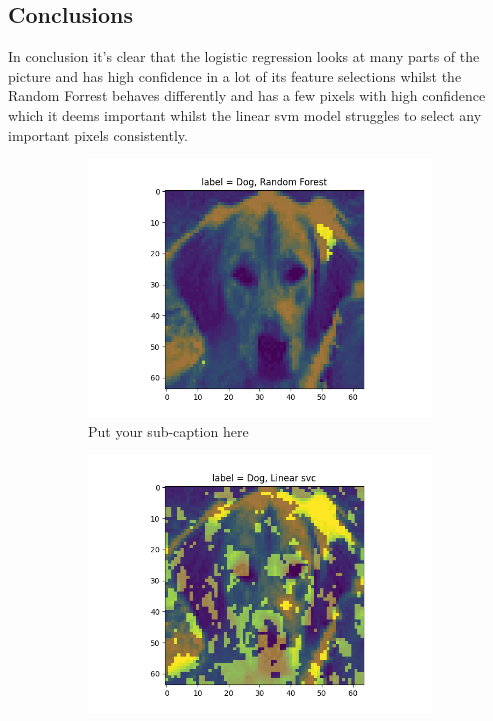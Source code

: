 \documentclass{article}
\begin{document}
\subsection{Conclusions}
In conclusion it's clear that the logistic regression looks at many parts of the picture and has high confidence in a lot of its feature selections whilst the Random Forrest behaves differently and has a few pixels with high confidence which it deems important whilst the linear svm model struggles to select any important pixels consistently. 
\begin{figure}[H]
\begin{subfigure}{.33\textwidth}
  \centering
  \includegraphics[width=1\linewidth]{1e/Dogs 2 clusters/imp feat RandomForest pic.png}  
  \caption{Put your sub-caption here}
  \label{rndf selection}
\end{subfigure}
\begin{subfigure}{.33\textwidth}
  \centering
  \includegraphics[width=1\linewidth]{1e/Dogs 2 clusters/imp_feat Linear svc.png}  

\end{subfigure}
\end{figure}
\end{document}
